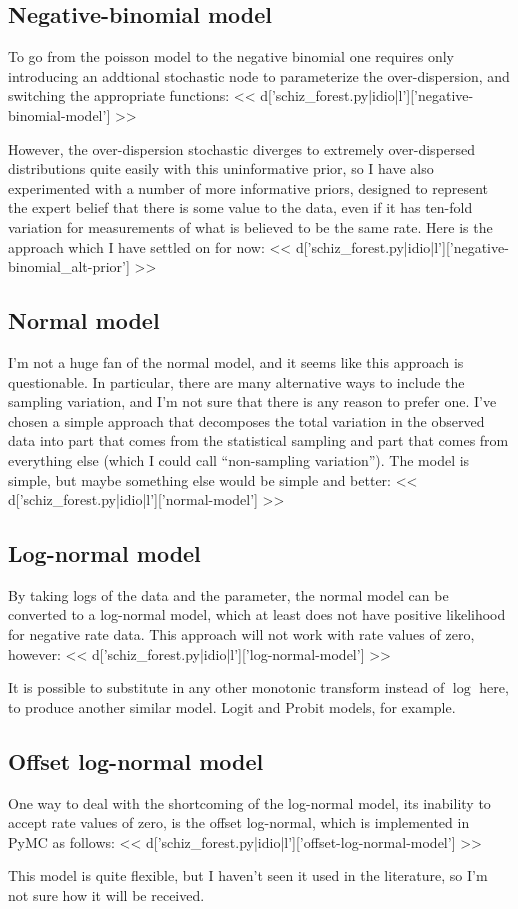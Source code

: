 \subsection{Negative-binomial model}
To go from the poisson model to the negative binomial one requires
only introducing an addtional stochastic node to parameterize the
over-dispersion, and switching the appropriate functions:
<< d['schiz_forest.py|idio|l']['negative-binomial-model'] >>

However, the over-dispersion stochastic diverges to extremely
over-dispersed distributions quite easily with this uninformative
prior, so I have also experimented with a number of more informative
priors, designed to represent the expert belief that there is some
value to the data, even if it has ten-fold variation for measurements
of what is believed to be the same rate.  Here is the approach which I
have settled on for now:
<< d['schiz_forest.py|idio|l']['negative-binomial_alt-prior'] >>

\subsection{Normal model}
I'm not a huge fan of the normal model, and it seems like this
approach is questionable.  In particular, there are many alternative
ways to include the sampling variation, and I'm not sure that there is
any reason to prefer one.  I've chosen a simple approach that
decomposes the total variation in the observed data into part that
comes from the statistical sampling and part that comes from
everything else (which I could call ``non-sampling variation'').  The
model is simple, but maybe something else would be simple and better:
<< d['schiz_forest.py|idio|l']['normal-model'] >>



\subsection{Log-normal model}
By taking logs of the data and the parameter, the normal model can be
converted to a log-normal model, which at least does not have positive
likelihood for negative rate data.  This approach will not work with
rate values of zero, however:
<< d['schiz_forest.py|idio|l']['log-normal-model'] >>

It is possible to substitute in any other monotonic transform instead
of $\log$ here, to produce another similar model.  Logit and Probit
models, for example.



\subsection{Offset log-normal model}
One way to deal with the shortcoming of the log-normal model, its
inability to accept rate values of zero, is the offset log-normal,
which is implemented in PyMC as follows:
<< d['schiz_forest.py|idio|l']['offset-log-normal-model'] >>

This model is quite flexible, but I haven't seen it used in the
literature, so I'm not sure how it will be received.

